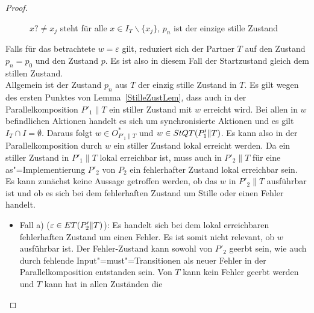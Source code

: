 \begin{proof}
\begin{figure} [h!tbp]
\begin{center}
    \caption{$x?\neq x_j$ steht für alle $x\in I_T\backslash\{x_j\}$, $p_n$
    ist der einzige stille Zustand}
  \label{TohneEmitI}
  \end{center}
  \end{figure}
  Falls für das betrachtete $w=\varepsilon$ gilt, reduziert sich der Partner
  $T$ auf den Zustand $p_n=p_0$ und den Zustand $p$. Es ist also in diesem Fall
  der Startzustand gleich dem stillen Zustand.\\
  Allgemein ist der Zustand $p_n$ aus $T$ der einzig stille Zustand in $T$. Es
  gilt wegen des ersten Punktes von Lemma~\ref{StilleZustLem}, dass auch in der
  Parallelkomposition $P'_1\|T$ ein stiller Zustand mit $w$ erreicht wird. Bei
  allen in $w$ befindlichen Aktionen handelt es sich um synchronisierte
  Aktionen und es gilt $I_T\cap I=\emptyset$. Daraus folgt $w\in O^*_{P'_1\|T}$
  und $w\in StQT (P'_1\|T)$. Es kann also in der Parallelkomposition durch $w$
  ein stiller Zustand lokal erreicht werden. Da ein stiller Zustand in
  $P'_1\|T$ lokal erreichbar ist, muss auch in $P'_2\|T$ für eine
  as"=Implementierung $P'_2$ von $P_2$ ein fehlerhafter Zustand lokal
  erreichbar sein. Es kann zunächst keine Aussage getroffen werden, ob das $w$
  in $P'_2\|T$ ausführbar ist und ob es sich bei dem fehlerhaften Zustand um
  Stille oder einen Fehler handelt.
  \begin{itemize}
    \item Fall a) ($\varepsilon\in ET (P'_2\|T)$): Es handelt sich bei dem
      lokal erreichbaren fehlerhaften Zustand um einen Fehler. Es ist somit
      nicht relevant, ob $w$ ausführbar ist. Der Fehler-Zustand kann sowohl von
      $P'_2$ geerbt sein, wie auch durch fehlende Input"=must"=Transitionen als
      neuer Fehler in der Parallelkomposition entstanden sein. Von $T$ kann
      kein Fehler geerbt werden und $T$ kann hat in allen Zuständen die

\end{itemize}
\end{proof}
